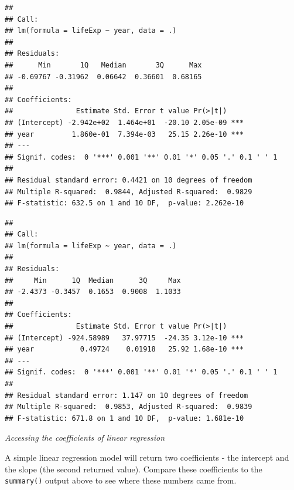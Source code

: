 \documentclass[
  12pt,
  krantz2]{krantz}
\makeatletter
\newenvironment{Shaded}{\begin{snugshade}}{\end{snugshade}}
\newcommand{\CommentTok}[1]{\textcolor[rgb]{0.56,0.35,0.01}{\textit{#1}}}
\newcommand{\DataTypeTok}[1]{\textcolor[rgb]{0.13,0.29,0.53}{#1}}
\newcommand{\KeywordTok}[1]{\textcolor[rgb]{0.13,0.29,0.53}{\textbf{#1}}}
\newcommand{\NormalTok}[1]{#1}
\newcommand{\OperatorTok}[1]{\textcolor[rgb]{0.81,0.36,0.00}{\textbf{#1}}}
\newcommand{\StringTok}[1]{\textcolor[rgb]{0.31,0.60,0.02}{#1}}
\newenvironment{kframe}{%
\medskip{}
\setlength{\fboxsep}{.8em}
 \def\at@end@of@kframe{}%
 \ifinner\ifhmode%
  \def\at@end@of@kframe{\end{minipage}}%
  \begin{minipage}{\columnwidth}%
 \fi\fi%
 \def\FrameCommand##1{\hskip\@totalleftmargin \hskip-\fboxsep
 \colorbox{shadecolor}{##1}\hskip-\fboxsep
     \hskip-\linewidth \hskip-\@totalleftmargin \hskip\columnwidth}%
 \MakeFramed {\advance\hsize-\width
   \@totalleftmargin\z@ \linewidth\hsize
   \@setminipage}}%
 {\par\unskip\endMakeFramed%
 \at@end@of@kframe}
\renewenvironment{Shaded}{\begin{kframe}}{\end{kframe}}
\makeatother
\begin{document}
\begin{verbatim}
## 
## Call:
## lm(formula = lifeExp ~ year, data = .)
## 
## Residuals:
##      Min       1Q   Median       3Q      Max 
## -0.69767 -0.31962  0.06642  0.36601  0.68165 
## 
## Coefficients:
##               Estimate Std. Error t value Pr(>|t|)    
## (Intercept) -2.942e+02  1.464e+01  -20.10 2.05e-09 ***
## year         1.860e-01  7.394e-03   25.15 2.26e-10 ***
## ---
## Signif. codes:  0 '***' 0.001 '**' 0.01 '*' 0.05 '.' 0.1 ' ' 1
## 
## Residual standard error: 0.4421 on 10 degrees of freedom
## Multiple R-squared:  0.9844, Adjusted R-squared:  0.9829 
## F-statistic: 632.5 on 1 and 10 DF,  p-value: 2.262e-10
\end{verbatim}

\begin{Shaded}
\end{Shaded}

\begin{verbatim}
## 
## Call:
## lm(formula = lifeExp ~ year, data = .)
## 
## Residuals:
##     Min      1Q  Median      3Q     Max 
## -2.4373 -0.3457  0.1653  0.9008  1.1033 
## 
## Coefficients:
##               Estimate Std. Error t value Pr(>|t|)    
## (Intercept) -924.58989   37.97715  -24.35 3.12e-10 ***
## year           0.49724    0.01918   25.92 1.68e-10 ***
## ---
## Signif. codes:  0 '***' 0.001 '**' 0.01 '*' 0.05 '.' 0.1 ' ' 1
## 
## Residual standard error: 1.147 on 10 degrees of freedom
## Multiple R-squared:  0.9853, Adjusted R-squared:  0.9839 
## F-statistic: 671.8 on 1 and 10 DF,  p-value: 1.681e-10
\end{verbatim}

\emph{Accessing the coefficients of linear regression}

A simple linear regression model will return two coefficients - the intercept and the slope (the second returned value).
Compare these coefficients to the \texttt{summary()} output above to see where these numbers came from.
\end{document}
